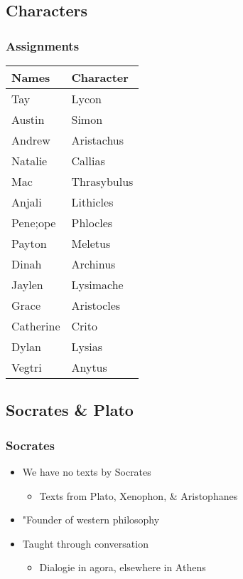 \documentclass[11pt]{article}
\begin{document}
\subsection{Characters}
\label{sec:org5d8bb69}
\subsubsection{Assignments}
\label{sec:org3dc2f9a}
\begin{center}
\begin{tabular}{ll}
Names & Character\\
\hline
Tay & Lycon\\
Austin & Simon\\
Andrew & Aristachus\\
Natalie & Callias\\
Mac & Thrasybulus\\
Anjali & Lithicles\\
Pene;ope & Phlocles\\
Payton & Meletus\\
Dinah & Archinus\\
Jaylen & Lysimache\\
Grace & Aristocles\\
Catherine & Crito\\
Dylan & Lysias\\
Vegtri & Anytus\\
\end{tabular}
\end{center}

\subsection{Socrates \& Plato}
\label{sec:org9a6d4d2}
\subsubsection{Socrates}
\label{sec:org2e3686c}
\begin{itemize}
\item We have no texts by Socrates
\begin{itemize}
\item Texts from Plato, Xenophon, \& Aristophanes
\end{itemize}
\item "Founder of western philosophy
\item Taught through conversation
\begin{itemize}
\item Dialogie in agora, elsewhere in Athens
\end{itemize}
\end{itemize}
\end{document}
